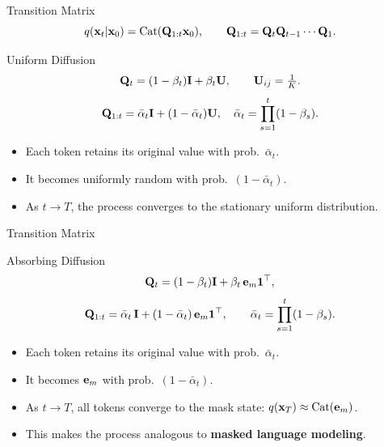 \documentclass{beamer}
\begin{document}
\begin{frame}{Transition Matrix}
	\[
		q(\mathbf{x}_t|\mathbf{x}_0) = \operatorname{Cat}(\mathbf{Q}_{1:t}\mathbf{x}_0),
		\qquad
		\mathbf{Q}_{1:t} = \mathbf{Q}_t \mathbf{Q}_{t-1} \cdots \mathbf{Q}_1.
	\]
	\eqpause
	\begin{block}{Uniform Diffusion}
		\[
			\mathbf{Q}_t = (1-\beta_t)\mathbf{I} + \beta_t \mathbf{U},
			\qquad
			\mathbf{U}_{ij} = \tfrac{1}{K}.
		\]
		\[
			\mathbf{Q}_{1:t} = \bar\alpha_t\mathbf{I} + (1 - \bar\alpha_t) \mathbf{U},
			\quad
			\bar\alpha_t = \prod_{s=1}^t (1-\beta_s).
		\]
		\eqpause
		\begin{itemize}
			\item Each token retains its original value with prob.~$\bar\alpha_t$.
			\item It becomes uniformly random with prob.~$(1 - \bar\alpha_t)$.
			\item As $t \to T$, the process converges to the stationary uniform distribution.
		\end{itemize}
	\end{block}
\end{frame}
\begin{frame}{Transition Matrix}

	\begin{block}{Absorbing Diffusion}
		\[
			\mathbf{Q}_t = (1-\beta_t)\mathbf{I} + \beta_t\, \mathbf{e}_m \mathbf{1}^\top,
		\]
		\[
			\mathbf{Q}_{1:t} = \bar\alpha_t\,\mathbf{I} + (1-\bar\alpha_t)\,\mathbf{e}_m \mathbf{1}^\top,
			\qquad
			\bar\alpha_t = \prod_{s=1}^t (1-\beta_s).
		\]
		\eqpause
		\begin{itemize}
			\item Each token retains its original value with prob.~$\bar\alpha_t$.
			\item It becomes $\mathbf{e}_m$ with prob.~$(1 - \bar\alpha_t)$.
			\item As $t \to T$, all tokens converge to the mask state: $q(\mathbf{x}_T) \approx \operatorname{Cat}(\mathbf{e}_m)$.
			\item This makes the process analogous to \textbf{masked language modeling}.
		\end{itemize}
	\end{block}
\end{frame}
\end{document}
